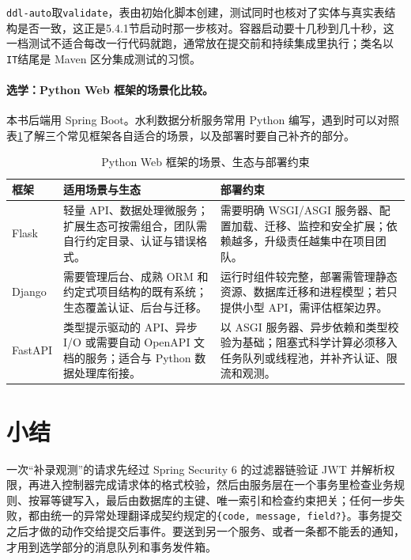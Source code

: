 \texttt{ddl-auto}取\texttt{validate}，表由初始化脚本创建，测试同时也核对了实体与真实表结构是否一致，这正是5.4.1节启动时那一步核对。容器启动要十几秒到几十秒，这一档测试不适合每改一行代码就跑，通常放在提交前和持续集成里执行；类名以\texttt{IT}结尾是 Maven 区分集成测试的习惯。

\begin{tipbox}
\paragraph{选学：Python Web 框架的场景化比较。} 本书后端用 Spring Boot。水利数据分析服务常用 Python 编写，遇到时可以对照表\ref{tab:ch05-python-frameworks}了解三个常见框架各自适合的场景，以及部署时要自己补齐的部分。
\end{tipbox}

\begin{table}[htbp]
\centering
\caption{Python Web 框架的场景、生态与部署约束}
\label{tab:ch05-python-frameworks}
\begin{tabular}{p{}p{}p{}}
\hline
框架 & 适用场景与生态 & 部署约束 \\
\hline
Flask & 轻量 API、数据处理微服务；扩展生态可按需组合，团队需自行约定目录、认证与错误格式。 & 需要明确 WSGI/ASGI 服务器、配置加载、迁移、监控和安全扩展；依赖越多，升级责任越集中在项目团队。 \\
Django & 需要管理后台、成熟 ORM 和约定式项目结构的既有系统；生态覆盖认证、后台与迁移。 & 运行时组件较完整，部署需管理静态资源、数据库迁移和进程模型；若只提供小型 API，需评估框架边界。 \\
FastAPI & 类型提示驱动的 API、异步 I/O 或需要自动 OpenAPI 文档的服务；适合与 Python 数据处理库衔接。 & 以 ASGI 服务器、异步依赖和类型校验为基础；阻塞式科学计算必须移入任务队列或线程池，并补齐认证、限流和观测。 \\
\hline
\end{tabular}
\end{table}

\section*{小结}

一次“补录观测”的请求先经过 Spring Security 6 的过滤器链验证 JWT 并解析权限，再进入控制器完成请求体的格式校验，然后由服务层在一个事务里检查业务规则、按幂等键写入，最后由数据库的主键、唯一索引和检查约束把关；任何一步失败，都由统一的异常处理翻译成契约规定的\texttt{\{code, message, field?\}}。事务提交之后才做的动作交给提交后事件。要送到另一个服务、或者一条都不能丢的通知，才用到选学部分的消息队列和事务发件箱。

